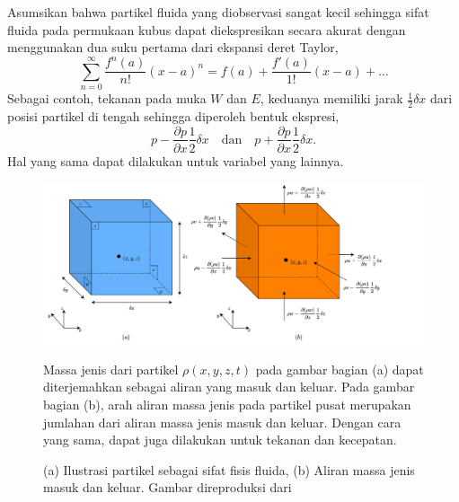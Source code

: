 \begin{spacing}{1.5}
	Asumsikan bahwa partikel fluida yang diobservasi sangat kecil sehingga sifat fluida pada permukaan kubus dapat diekspresikan secara akurat dengan menggunakan dua suku pertama dari ekspansi deret Taylor, 
	\begin{equation*}
		\sum_{n=0}^{\infty}\frac{f^{n}(a)}{n!}(x-a)^n = f(a)+\frac{f'(a)}{1!}(x-a)+\dots
	\end{equation*} 
	Sebagai contoh, tekanan pada muka $W$ dan $E$, keduanya memiliki jarak $\frac{1}{2}\delta x$ dari posisi partikel di tengah sehingga diperoleh bentuk ekspresi,
	\begin{equation*}
		p-\frac{\partial p}{\partial x}\frac{1}{2}\delta x \quad \text{dan} \quad
		p+\frac{\partial p}{\partial x}\frac{1}{2}\delta x.
	\end{equation*}
	Hal yang sama dapat dilakukan untuk variabel yang lainnya.
	\begin{figure}[H]
		\centering
		\includegraphics[width=16cm]{contents/cube}
		\caption{(a) Ilustrasi partikel sebagai sifat fisis fluida, (b) Aliran massa jenis masuk dan keluar. Gambar direproduksi dari \protect{}}
		\label{fig:cube}
		\medspace
		\small
		Massa jenis dari partikel $\rho(x,y,z,t)$ pada gambar bagian (a) dapat diterjemahkan sebagai aliran yang masuk dan keluar. Pada gambar bagian (b), arah aliran massa jenis pada partikel pusat merupakan jumlahan dari aliran massa jenis masuk dan keluar. Dengan cara yang sama, dapat juga dilakukan untuk tekanan dan kecepatan. 
	\end{figure}
	
\end{spacing}
\vspace{-1pc}
